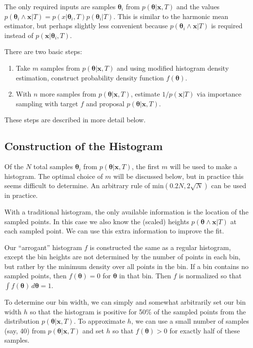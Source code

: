 \documentclass[letterpaper,12pt]{article}
\newcommand{\bx}{\boldsymbol x}
\newcommand{\btheta}{\boldsymbol \theta}
\begin{document}
The only required inputs are samples $\btheta_i$ from $p(\btheta|\bx,
T)$ and the values $p(\btheta_i \wedge \bx|T) =
p(x|\btheta_i,T)p(\btheta_i|T)$.  This is similar to the harmonic mean
estimator, but perhaps slightly less convenient because $p(\btheta_i
\wedge \bx|T)$ is required instead of $p(\bx|\btheta_i,T)$.

There are two basic steps:

\begin{enumerate}
  \item Take $m$ samples from $p(\btheta|\bx, T)$ and using
    modified histogram density estimation, construct probability
    density function $f(\btheta)$.
  \item With $n$ more samples from $p(\btheta|\bx, T)$, estimate
    $1/p(\bx|T)$ via importance sampling with target $f$ and proposal
    $p(\btheta|\bx, T)$.
\end{enumerate}

\noindent These steps are described in more detail below.

\subsection{Construction of the Histogram}

Of the $N$ total samples $\btheta_i$ from $p(\btheta|\bx, T)$, the
first $m$ will be used to make a histogram.  The optimal choice of $m$
will be discussed below, but in practice this seems difficult to
determine.  An arbitrary rule of $\mbox{min}(0.2 N, 2 \sqrt{N})$ can
be used in practice.

With a traditional histogram, the only available information is the
location of the sampled points.  In this case we also know the
(scaled) heights $p(\btheta \wedge \bx|T)$ at each sampled point.  We
can use this extra information to improve the fit.

Our ``arrogant'' histogram $f$ is constructed the same as a regular
histogram, except the bin heights are not determined by the number of
points in each bin, but rather by the minimum density over all points
in the bin.  If a bin contains no sampled points, then $f(\btheta) =
0$ for $\btheta$ in that bin.  Then $f$ is normalized so that $\int
f(\btheta) \,d\btheta = 1$.

To determine our bin width, we can simply and somewhat arbitrarily set
our bin width $h$ so that the histogram is positive for 50\% of the
sampled points from the distribution $p(\btheta|\bx, T)$.  To
approximate $h$, we can use a small number of samples (say, 40) from
$p(\btheta|\bx, T)$ and set $h$ so that $f(\btheta) > 0$ for exactly
half of these samples.
\end{document}
